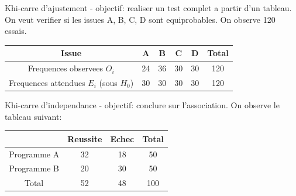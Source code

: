 \begin{questions}
\pageblanche
\question[8] Khi-carre d'ajustement - objectif: realiser un test complet a partir d'un tableau.
On veut verifier si les issues A, B, C, D sont equiprobables.
On observe 120 essais.

\begin{center}
\begin{tabular}{c|cccc|c}
Issue & A & B & C & D & Total\\
\hline
Frequences observees $O_i$ & 24 & 36 & 30 & 30 & 120\\
Frequences attendues $E_i$ (sous $H_0$) & 30 & 30 & 30 & 30 & 120
\end{tabular}
\end{center}


\pageblanche
\question[8] Khi-carre d'independance - objectif: conclure sur l'association.
On observe le tableau suivant:
\begin{center}
\begin{tabular}{c|cc|c}
 & Reussite & Echec & Total\\
\hline
Programme A & 32 & 18 & 50\\
Programme B & 20 & 30 & 50\\
\hline
Total & 52 & 48 & 100
\end{tabular}
\end{center}


\end{questions}
